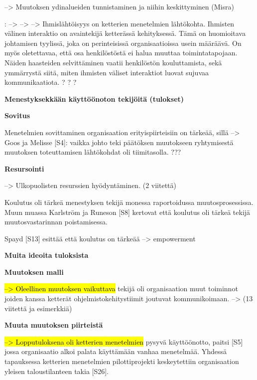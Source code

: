--> Muutoksen ydinalueiden tunnistaminen ja niihin keskittyminen (Misra)

: --> -->
--> Ihmislähtöisyys on ketterien menetelmien lähtökohta. Ihmisten välinen
interaktio on avaintekijä ketterässä kehityksessä. Tämä on huomioitava
johtamisen tyylissä, joka on perinteisissä organisaatioissa usein määräävä. On
myös oletettavaa, että osa henkilöstöstä ei halua muuttaa toimintatapojaan.
Näiden haasteiden selvittäminen vaatii henkilöstön kouluttamista, sekä
ymmärrystä siitä, miten ihmisten väliset interaktiot luovat sujuvaa
kommunikaatiota. ? ? ?

\vspace{1cm}
\large
\textbf{Menestyksekkään käyttöönoton tekijöitä (tulokset)}
\normalsize

\textbf{Sovitus}

Menetelmien sovittaminen organisaation erityispiirteisiin on tärkeää, sillä -->
Goos ja Melisse [S4]: vaikka johto teki päätöksen muutokseen ryhtymisestä
muutoksen toteuttamisen lähtökohdat oli tiimitasolla. ???

\textbf{Resursointi}

--> Ulkopuolisten resurssien hyödyntäminen. (2 viitettä)

Koulutus oli tärkeä menestyksen tekijä monessa raportoidussa muutosprosessissa.
Muun muassa Karlström ja Runeson [S8] kertovat että koulutus oli tärkeä tekijä
muutosvastarinnan poistamisessa.

Spayd [S13] esittää että koulutus on tärkeää --> empowerment

\vspace{1cm}
\large
\textbf{Muita ideoita tuloksista}
\normalsize

\textbf{Muutoksen malli}

\hl{--> Oleellinen muutoksen vaikuttava} tekijä oli organisaation muut toiminnot
joiden kanssa ketterät ohjelmistokehitystiimit joutuvat kommunikoimaan.
--> (13 viitettä ja esimerkkiä)

\textbf{Muuta muutoksen piirteistä}

\hl{--> Lopputuloksena oli ketterien menetelmien} pysyvä käyttöönotto, paitsi [S5]
jossa organisaatio alkoi palata käyttämään vanhaa menetelmää. Yhdessä
tapauksessa ketterien menetelmien pilottiprojekti keskeytettiin
organisaation yleisen taloustilanteen takia [S26].
